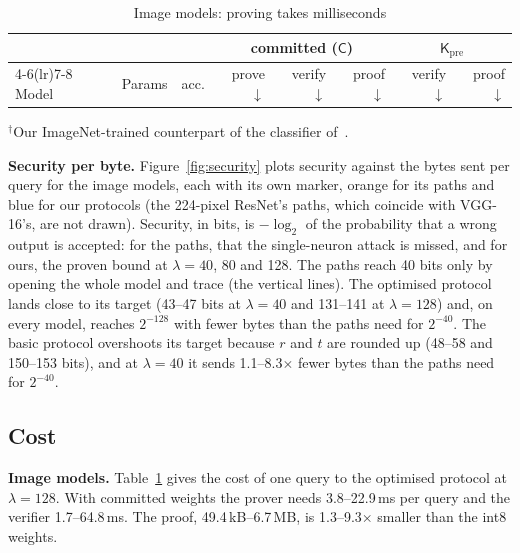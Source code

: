\documentclass[sigconf,nonacm]{acmart}
\newcommand{\Kpre}{\mathsf{K}_{\mathrm{pre}}}
\newcommand{\sC}{\mathsf{C}}
\newcommand{\para}[1]{\par\noindent\textbf{#1}\quad}
\begin{document}
\begin{table}[t]
  \caption{Image models: proving takes milliseconds}
  \label{tab:cnn}
  \footnotesize
  \setlength{\tabcolsep}{2.6pt}
  \begin{tabular}{lrrrrrrr}
    \toprule
    & & & \multicolumn{3}{c}{committed ($\sC$)} & \multicolumn{2}{c}{$\Kpre$} \\
    \cmidrule(lr){4-6}\cmidrule(lr){7-8}
    Model & Params & acc. & prove$\downarrow$ & verify$\downarrow$ & proof$\downarrow$ & verify$\downarrow$ & proof$\downarrow$ \\
    \midrule
    
  \end{tabular}

  \smallskip
  {\footnotesize $^\dagger$Our ImageNet-trained counterpart of the classifier of~\cite{anchuri2026verifiable}.}
\end{table}

\para{Security per byte.} Figure~\ref{fig:security} plots security against the bytes sent per query for the image models,
each with its own marker, orange for its paths and blue for our protocols (the 224-pixel ResNet's paths,
which coincide with VGG-16's, are not drawn). Security, in bits, is $-\log_2$ of the probability that a wrong output is accepted: for the paths,
that the single-neuron attack is missed, and for ours, the proven bound at $\lambda{=}40$, 80 and
128. The paths reach 40 bits only by opening the whole model and trace (the vertical lines). The
optimised protocol
lands close to its target (43--47 bits at $\lambda{=}40$ and
131--141 at $\lambda{=}128$)
and, on every model, reaches $2^{-128}$ with fewer bytes than the paths need for
$2^{-40}$. The basic protocol overshoots its target because $r$ and $t$ are rounded up (48--58
and 150--153 bits), and at $\lambda{=}40$ it sends 1.1--8.3$\times$ fewer bytes than the paths
need for $2^{-40}$.

\subsection{Cost}
\label{sec:cost}

\para{Image models.} Table~\ref{tab:cnn} gives the cost of one query to the optimised protocol
at $\lambda{=}128$. With committed weights the prover needs
3.8--22.9\,ms per query and the verifier 1.7--64.8\,ms. The proof,
49.4\,kB--6.7\,MB, is 1.3--9.3$\times$ smaller than the int8 weights.
\end{document}
